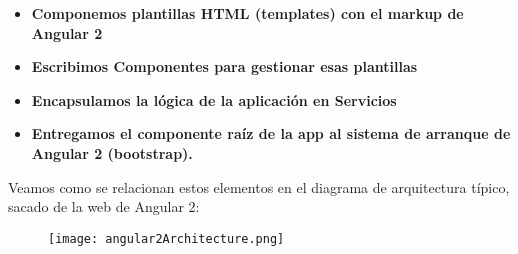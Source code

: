 \begin{itemize}

\item \textbf{Componemos plantillas HTML (templates) con el markup de Angular 2}
\item \textbf{Escribimos Componentes para gestionar esas plantillas}
\item \textbf{Encapsulamos la lógica de la aplicación en Servicios}
\item \textbf{Entregamos el componente raíz de la app al sistema de arranque de Angular 2 (bootstrap).}
\end{itemize}

Veamos como se relacionan estos elementos en el diagrama de arquitectura típico, sacado de la web de Angular 2:

\begin{figure}[H]
    \centering
    \texttt{[image: angular2Architecture.png]}
\end{figure}

